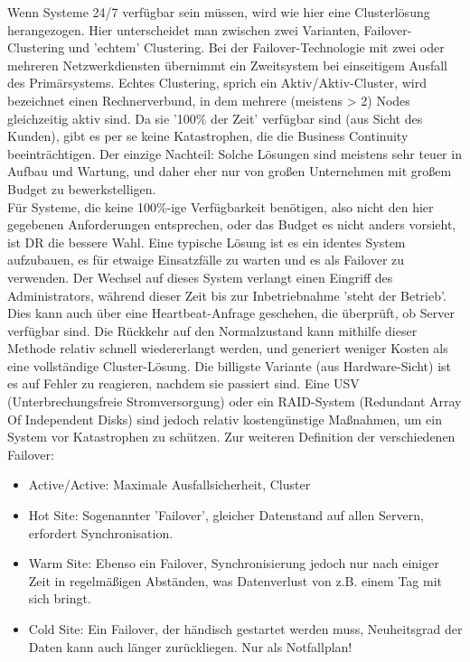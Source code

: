 \documentclass[letterpaper, 12pt]{article}
\begin{document}
Wenn Systeme 24/7 verfügbar sein müssen, wird wie hier eine Clusterlösung herangezogen. Hier unterscheidet
man zwischen zwei Varianten, Failover-Clustering und ’echtem’ Clustering. Bei der
Failover-Technologie mit zwei oder mehreren Netzwerkdiensten übernimmt ein Zweitsystem bei
einseitigem Ausfall des Primärsystems. Echtes Clustering, sprich ein Aktiv/Aktiv-Cluster, wird
bezeichnet einen Rechnerverbund, in dem mehrere (meistens > 2) Nodes gleichzeitig aktiv sind. Da sie '100\% der Zeit' verfügbar sind (aus Sicht des Kunden), gibt es per se keine Katastrophen, die die Business Continuity beeinträchtigen. Der einzige Nachteil:
Solche Lösungen sind meistens sehr teuer in Aufbau und Wartung, und daher eher nur von
großen Unternehmen mit großem Budget zu bewerkstelligen. \\
Für Systeme, die keine 100\%-ige Verfügbarkeit benötigen, also nicht den hier gegebenen Anforderungen entsprechen, oder das Budget es nicht anders vorsieht,
ist DR die bessere Wahl. Eine typische Lösung ist es ein identes System aufzubauen, es für etwaige
Einsatzfälle zu warten und es als Failover zu verwenden. Der Wechsel auf dieses System verlangt
einen Eingriff des Administrators, während dieser Zeit bis zur Inbetriebnahme ’steht der Betrieb’. Dies kann auch über eine Heartbeat-Anfrage geschehen, die überprüft, ob Server verfügbar sind. 
Die Rückkehr auf den Normalzustand kann mithilfe dieser Methode relativ schnell wiedererlangt
werden, und generiert weniger Kosten als eine vollständige Cluster-Lösung. Die billigste Variante (aus Hardware-Sicht) ist es auf Fehler zu reagieren, nachdem sie passiert
sind. Eine USV (Unterbrechungsfreie Stromversorgung) oder ein RAID-System (Redundant Array Of Independent Disks) sind jedoch relativ kostengünstige Maßnahmen, um ein System vor Katastrophen zu schützen. \clearpage Zur weiteren Definition der verschiedenen Failover: \cite{ausarbeitungdis}
\begin{itemize}
	\item Active/Active: \newline Maximale Ausfallsicherheit, Cluster
	\item Hot Site: \newline Sogenannter 'Failover', gleicher Datenstand auf allen Servern, erfordert Synchronisation.
	\item Warm Site: \newline Ebenso ein Failover, Synchronisierung jedoch nur nach einiger Zeit in regelmäßigen Abständen, was Datenverlust von z.B. einem Tag mit sich bringt.
	\item Cold Site: Ein Failover, der händisch gestartet werden muss, Neuheitsgrad der Daten kann auch länger zurückliegen. Nur als Notfallplan! \cite{ausarbeitungdis}
\end{itemize}
\end{document}
